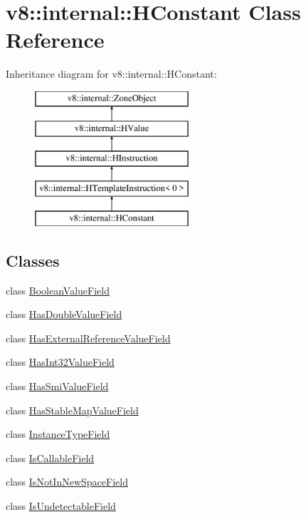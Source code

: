\hypertarget{classv8_1_1internal_1_1_h_constant}{}\section{v8\+:\+:internal\+:\+:H\+Constant Class Reference}
\label{classv8_1_1internal_1_1_h_constant}
Inheritance diagram for v8\+:\+:internal\+:\+:H\+Constant\+:\begin{figure}[H]
\begin{center}
\leavevmode
\includegraphics[height=5.000000cm]{classv8_1_1internal_1_1_h_constant}
\end{center}
\end{figure}
\subsection*{Classes}
\begin{DoxyCompactItemize}
\item 
class \hyperlink{classv8_1_1internal_1_1_h_constant_1_1_boolean_value_field}{Boolean\+Value\+Field}
\item 
class \hyperlink{classv8_1_1internal_1_1_h_constant_1_1_has_double_value_field}{Has\+Double\+Value\+Field}
\item 
class \hyperlink{classv8_1_1internal_1_1_h_constant_1_1_has_external_reference_value_field}{Has\+External\+Reference\+Value\+Field}
\item 
class \hyperlink{classv8_1_1internal_1_1_h_constant_1_1_has_int32_value_field}{Has\+Int32\+Value\+Field}
\item 
class \hyperlink{classv8_1_1internal_1_1_h_constant_1_1_has_smi_value_field}{Has\+Smi\+Value\+Field}
\item 
class \hyperlink{classv8_1_1internal_1_1_h_constant_1_1_has_stable_map_value_field}{Has\+Stable\+Map\+Value\+Field}
\item 
class \hyperlink{classv8_1_1internal_1_1_h_constant_1_1_instance_type_field}{Instance\+Type\+Field}
\item 
class \hyperlink{classv8_1_1internal_1_1_h_constant_1_1_is_callable_field}{Is\+Callable\+Field}
\item 
class \hyperlink{classv8_1_1internal_1_1_h_constant_1_1_is_not_in_new_space_field}{Is\+Not\+In\+New\+Space\+Field}
\item 
class \hyperlink{classv8_1_1internal_1_1_h_constant_1_1_is_undetectable_field}{Is\+Undetectable\+Field}
\end{DoxyCompactItemize}
